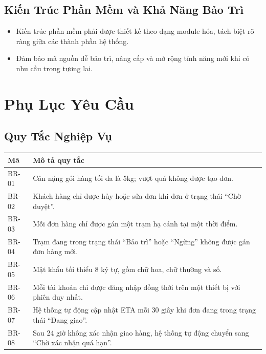 \subsection{Kiến Trúc Phần Mềm và Khả Năng Bảo Trì}
\begin{itemize}
  \item Kiến trúc phần mềm phải được thiết kế theo dạng module hóa, tách biệt rõ ràng giữa các thành phần hệ thống.
  \item Đảm bảo mã nguồn dễ bảo trì, nâng cấp và mở rộng tính năng mới khi có nhu cầu trong tương lai.
\end{itemize}

\section{Phụ Lục Yêu Cầu}

\subsection{Quy Tắc Nghiệp Vụ}

\begin{longtable}{|l|p{12cm}|}
  \hline
  \textbf{Mã} & \textbf{Mô tả quy tắc} \\
  \hline
  \endhead
  \hline
  \endfoot
  BR-01 & Cân nặng gói hàng tối đa là 5kg; vượt quá không được tạo đơn. \\ \hline
  BR-02 & Khách hàng chỉ được hủy hoặc sửa đơn khi đơn ở trạng thái ``Chờ duyệt''. \\ \hline
  BR-03 & Mỗi đơn hàng chỉ được gán một trạm hạ cánh tại một thời điểm. \\ \hline
  BR-04 & Trạm đang trong trạng thái ``Bảo trì'' hoặc ``Ngừng'' không được gán đơn hàng mới. \\ \hline
  BR-05 & Mật khẩu tối thiểu 8 ký tự, gồm chữ hoa, chữ thường và số. \\ \hline
  BR-06 & Mỗi tài khoản chỉ được đăng nhập đồng thời trên một thiết bị với phiên duy nhất. \\ \hline
  BR-07 & Hệ thống tự động cập nhật ETA mỗi 30 giây khi đơn đang trong trạng thái ``Đang giao''. \\ \hline
  BR-08 & Sau 24 giờ không xác nhận giao hàng, hệ thống tự động chuyển sang ``Chờ xác nhận quá hạn''. \\
\end{longtable}

